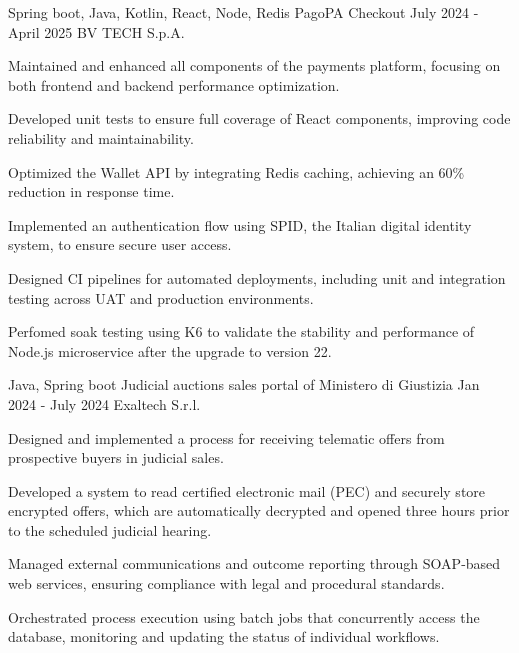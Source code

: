 

\begin{cventries}

  \cventry
    {Spring boot, Java, Kotlin, React, Node, Redis} %
    {PagoPA Checkout} %
    {July 2024 - April 2025} %
    {BV TECH S.p.A.} %
    {
      \begin{cvitems} %
        \item {Maintained and enhanced all components of the payments platform, focusing on both frontend and backend performance optimization.}
        \item {Developed unit tests to ensure full coverage of React components, improving code reliability and maintainability.}  
        \item {Optimized the Wallet API by integrating Redis caching, achieving an 60\% reduction in response time.}  
        \item {Implemented an authentication flow using SPID, the Italian digital identity system, to ensure secure user access.}  
        \item {Designed CI pipelines for automated deployments, including unit and integration testing across UAT and production environments.}  
        \item {Perfomed soak testing using K6 to validate the stability and performance of Node.js microservice after the upgrade to version 22.}  
      \end{cvitems}
    }

  \cventry
    {Java, Spring boot} %
    {Judicial auctions sales portal of Ministero di Giustizia} %
    {Jan 2024 - July 2024} %
    {Exaltech S.r.l.} %
    {
      \begin{cvitems} %
        \item {Designed and implemented a process for receiving telematic offers from prospective buyers in judicial sales.}
        \item {Developed a system to read certified electronic mail (PEC) and securely store encrypted offers, which are automatically decrypted and opened three hours prior to the scheduled judicial hearing.}  
        \item {Managed external communications and outcome reporting through SOAP-based web services, ensuring compliance with legal and procedural standards.}  
        \item {Orchestrated process execution using batch jobs that concurrently access the database, monitoring and updating the status of individual workflows.}  
      \end{cvitems}
    }


\end{cventries}
